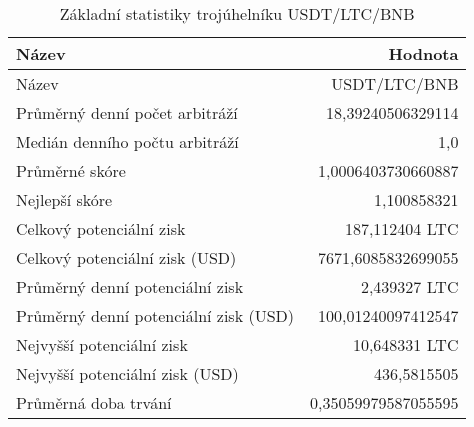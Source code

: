 \begin{table}\centering
\caption{Základní statistiky trojúhelníku USDT/LTC/BNB}
\label{USDTLTCBNB_stats}
\begin{tabular}{|| l | r ||}
\hline Název & Hodnota \\ 
\hline\hline Název & USDT/LTC/BNB \\ 
\hline Průměrný denní počet arbitráží & 18,39240506329114 \\ 
\hline Medián denního počtu arbitráží & 1,0 \\ 
\hline Průměrné skóre & 1,0006403730660887 \\ 
\hline Nejlepší skóre & 1,100858321 \\ 
\hline Celkový potenciální zisk & 187,112404 LTC \\ 
\hline Celkový potenciální zisk (USD) & 7671,6085832699055 \\ 
\hline Průměrný denní potenciální zisk & 2,439327 LTC \\ 
\hline Průměrný denní potenciální zisk (USD) & 100,01240097412547 \\ 
\hline Nejvyšší potenciální zisk & 10,648331 LTC \\ 
\hline Nejvyšší potenciální zisk (USD) & 436,5815505 \\ 
\hline Průměrná doba trvání & 0,35059979587055595 \\ 
\hline
\end{tabular}
\end{table}